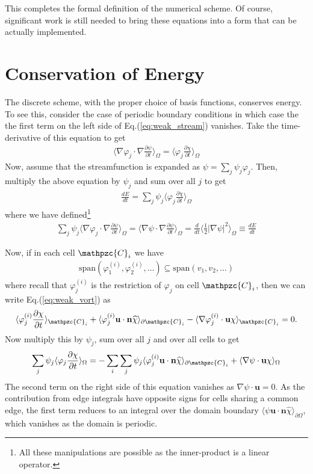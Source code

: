 \documentclass[11pt, reqno]{amsart}
\newcommand{\eqr}[1]{Eq.\thinspace(#1)}
\newcommand{\pfrac}[2]{\frac{\partial #1}{\partial #2}}
\newcommand{\mvec}[1]{\mathbf{#1}}
\newcommand{\script}[1]{\mathpzc{#1}}
\newcommand{\iprod}[2]{\langle{#1}\rangle_{#2}}
\theoremstyle{definition}
\begin{document}
This completes the formal definition of the numerical scheme. Of
course, significant work is still needed to bring these equations into
a form that can be actually implemented.

\section{Conservation of Energy}

The discrete scheme, with the proper choice of basis functions,
conserves energy. To see this, consider the case of periodic boundary
conditions in which case the the first term on the left side of
\eqr{\ref{eq:weak_stream}} vanishes. Take the time-derivative of this
equation to get
\begin{align}
  \iprod{\nabla \varphi_j\cdot \nabla\pfrac{\psi}{t}}{\Omega}
  =
  \iprod{\varphi_j\pfrac{\chi}{t}}{\Omega}
\end{align}
Now, assume that the streamfunction is expanded as $\psi =
\sum_j\psi_j\varphi_j$. Then, multiply the above equation by $\psi_j$
and sum over all $j$ to get
\begin{align}
  \frac{dE}{dt}
  =
  \sum_j \psi_j \iprod{\varphi_j\pfrac{\chi}{t}}{\Omega}
\end{align}
where we have defined\footnote{All these manipulations are possible
  as the inner-product is a linear operator.}
\begin{align}
  \sum_j \psi_j \iprod{\nabla \varphi_j\cdot
    \nabla\pfrac{\psi}{t}}{\Omega}
  =
  \iprod{\nabla \psi\cdot \nabla\pfrac{\psi}{t}}{\Omega}  
  =
  \frac{d}{dt} \iprod{\frac{1}{2} |\nabla \psi|^2}{\Omega}
  \equiv
  \frac{dE}{dt}
\end{align}

Now, if in each cell $\script{C}_i$ we have
\begin{align}
  \textrm{span}(\varphi_1^{(i)},\varphi_2^{(i)},\ldots)
  \subseteq
  \textrm{span}(v_1,v_2,\ldots) \label{eq:span_cond}
\end{align}
where recall that $\varphi_j^{(i)}$ is the restriction of $\varphi_j$
on cell $\script{C}_i$, then we can write \eqr{\ref{eq:weak_vort}}
as
\begin{align}
  \iprod{\varphi_j^{(i)}\pfrac{\chi}{t}}{\script{C}_i} 
  +
  \iprod{\varphi_j^{(i)}\mvec{u}\cdot\mvec{n} \widehat{\chi}}{\partial \script{C}_i}
  -
  \iprod{\nabla \varphi_j^{(i)}\cdot \mvec{u}\chi}{\script{C}_i}
  = 0.
\end{align}
Now multiply this by $\psi_j$, sum over all $j$ and over all cells to
get
\begin{align}
  \sum_j \psi_j \iprod{\varphi_j \pfrac{\chi}{t}}{\Omega}
  =
  - 
  \sum_i \sum_j \psi_j \iprod{\varphi_j^{(i)}\mvec{u}\cdot\mvec{n} \widehat{\chi}}{\partial \script{C}_i}
  +
  \iprod{\nabla \psi \cdot \mvec{u}\chi}{\Omega}
\end{align}
The second term on the right side of this equation vanishes as $\nabla
\psi \cdot \mvec{u} = 0$. As the contribution from edge integrals have
opposite signs for cells sharing a common edge, the first term reduces
to an integral over the domain boundary
$\iprod{\psi\mvec{u}\cdot\mvec{n} \widehat{\chi}}{\partial\Omega}$,
which vanishes as the domain is periodic.
\end{document}

